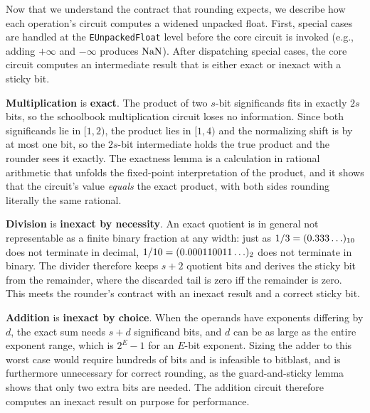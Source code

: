 Now that we understand the contract that rounding expects,
we describe how each operation's circuit computes a widened unpacked float.
First, special cases are handled at the \texttt{EUnpackedFloat} level before the core circuit is invoked
(e.g., adding $+\infty$ and $-\infty$ produces $\mathrm{NaN}$).
After dispatching special cases, the core circuit computes an intermediate result that is either exact or inexact with a sticky bit.

\begin{center}
\end{center}

\noindent\textbf{Multiplication} is \textcolor{pairedFourDarkGreen}{\textbf{exact}}.
The product of two $s$-bit significands fits in exactly $2s$ bits, so the schoolbook multiplication circuit loses no information.
Since both significands lie in $[1,2)$, the product lies in $[1,4)$ and the normalizing shift is by at most one bit, so the $2s$-bit intermediate holds the true product and the rounder sees it exactly.
The exactness lemma is a calculation in rational arithmetic that unfolds the fixed-point interpretation of the product, and it shows that the circuit's value \emph{equals} the exact product, with both sides rounding literally the same rational.

\begin{center}
\end{center}

\noindent\textbf{Division} is \textcolor{pairedSixDarkRed}{\textbf{inexact by necessity}}.
An exact quotient is in general not representable as a finite binary fraction at any width: just as $1/3 = (0.333\ldots)_{10}$ does not terminate in decimal, $1/10 = (0.000110011\ldots)_{2}$ does not terminate in binary.
The divider therefore keeps $s+2$ quotient bits and derives the sticky bit from the remainder, where the discarded tail is zero iff the remainder is zero.
This meets the rounder's contract with an inexact result and a correct sticky bit.

\begin{center}
\end{center}

\noindent\textbf{Addition} is \textcolor{pairedSixDarkRed}{\textbf{inexact by choice}}.
When the operands have exponents differing by $d$,
the exact sum needs $s + d$ significand bits,
and $d$ can be as large as the entire exponent range, which is $2^{E} - 1$ for an $E$-bit exponent.
Sizing the adder to this worst case would require hundreds of bits and is infeasible to bitblast,
and is furthermore unnecessary for correct rounding,
as the guard-and-sticky lemma shows that only two extra bits are needed.
The addition circuit therefore computes an inexact result on purpose for performance.

